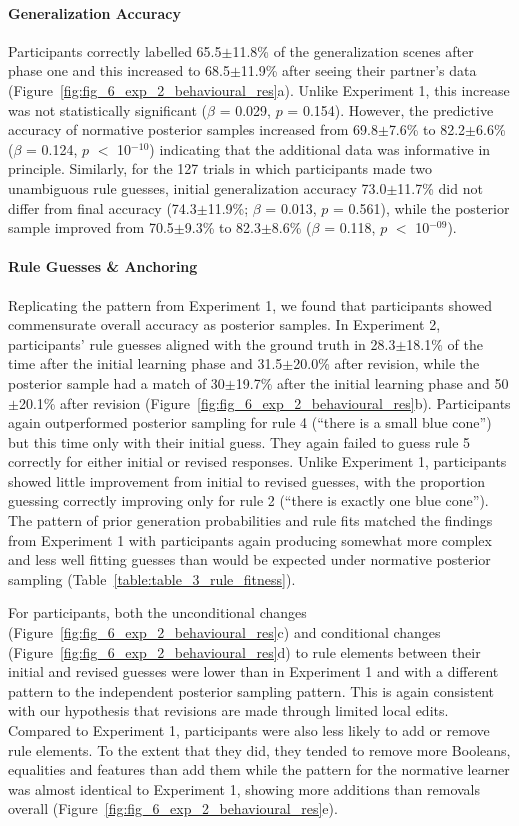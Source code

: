 \documentclass[doc,natbib,floatsintext]{apa7}
\begin{document}
\paragraph{Generalization Accuracy}
Participants correctly labelled 65.5$\pm$11.8\% of the generalization scenes after phase one and this increased to 68.5$\pm$11.9\% after seeing their partner's data (Figure~\ref{fig:fig_6_exp_2_behavioural_res}a). Unlike Experiment 1, this increase was not statistically significant ($\beta$ = 0.029, $p$ = 0.154). However, the predictive accuracy of normative posterior samples increased from 69.8$\pm$7.6\% to 82.2$\pm$6.6\% ($\beta$ = 0.124, $p$ $<$ 10$^{-10}$) indicating that the additional data was informative in principle. Similarly, for the 127 trials in which participants made two unambiguous rule guesses, initial generalization accuracy 73.0$\pm$11.7\% did not differ from
final accuracy (74.3$\pm$11.9\%; $\beta$ = 0.013, $p$ = 0.561), while the posterior sample improved from 70.5$\pm$9.3\% to 82.3$\pm$8.6\% ($\beta$ = 0.118, $p$ $<$ 10$^{-09}$).


\paragraph{Rule Guesses \& Anchoring}
Replicating the pattern from Experiment 1, we found that participants showed commensurate overall accuracy as posterior samples. In Experiment 2, participants' rule guesses aligned with the ground truth in 28.3$\pm$18.1\% of the time after the initial learning phase and  31.5$\pm$20.0\% after revision, while the posterior sample had a match of 30$\pm$19.7\% after the initial learning phase and 50$\pm$20.1\% after revision (Figure~\ref{fig:fig_6_exp_2_behavioural_res}b). Participants again outperformed posterior sampling for rule 4 (``there is a small blue cone'') but this time only with their initial guess. They again failed to guess rule 5 correctly for either initial or revised responses. Unlike Experiment 1, participants showed little improvement from initial to revised guesses, with the proportion guessing correctly improving only for rule 2 (``there is exactly one blue cone''). The pattern of prior generation probabilities and rule fits matched the findings from Experiment 1 with participants again producing somewhat more complex and less well fitting guesses than would be expected under normative posterior sampling (Table~\ref{table:table_3_rule_fitness}).

For participants, both the unconditional changes (Figure~\ref{fig:fig_6_exp_2_behavioural_res}c) and conditional changes (Figure~\ref{fig:fig_6_exp_2_behavioural_res}d) to rule elements between their initial and revised guesses were lower than in Experiment 1 and with a different pattern to the independent posterior sampling pattern. This is again consistent with our hypothesis that revisions are made through limited local edits. Compared to Experiment 1, participants were also less likely to add or remove rule elements. To the extent that they did, they tended to remove more Booleans, equalities and features than add them while the pattern for the normative learner was almost identical to Experiment 1, showing more additions than removals overall (Figure~\ref{fig:fig_6_exp_2_behavioural_res}e).
 
\end{document}
